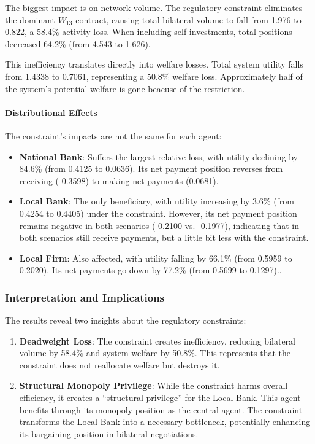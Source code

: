 The biggest impact is on network volume. The regulatory constraint eliminates the dominant $W_{13}$ contract, causing total bilateral volume to fall from 1.976 to 0.822, a 58.4\% activity loss. When including self-investments, total positions decreased 64.2\% (from 4.543 to 1.626).

This inefficiency translates directly into welfare losses. Total system utility falls from 1.4338 to 0.7061, representing a 50.8\% welfare loss. Approximately half of the system's potential welfare is gone beacuse of the restriction.

\paragraph{Distributional Effects}

The constraint's impacts are not the same for each agent:

\begin{itemize}
    \item \textbf{National Bank}: Suffers the largest relative loss, with utility declining by 84.6\% (from 0.4125 to 0.0636). Its net payment position reverses from receiving (-0.3598) to making net payments (0.0681).
    
    \item \textbf{Local Bank}: The only beneficiary, with utility increasing by 3.6\% (from 0.4254 to 0.4405) under the constraint. However, its net payment position remains negative in both scenarios (-0.2100 vs. -0.1977), indicating that in both scenarios still receive payments, but a little bit less with the constraint.

    \item \textbf{Local Firm}: Also affected, with utility falling by 66.1\% (from 0.5959 to 0.2020). Its net payments go down by 77.2\% (from 0.5699 to 0.1297)..
\end{itemize}

\subsubsection{Interpretation and Implications}

The results reveal two insights about the regulatory constraints:

\begin{enumerate}
    \item \textbf{Deadweight Loss}: The constraint creates inefficiency, reducing bilateral volume by 58.4\% and system welfare by 50.8\%. This represents that the constraint does not reallocate welfare but destroys it.
    
    \item \textbf{Structural Monopoly Privilege}: While the constraint harms overall efficiency, it creates a ``structural privilege'' for the Local Bank. This agent benefits through its monopoly position as the central agent. The constraint transforms the Local Bank into a necessary bottleneck, potentially enhancing its bargaining position in bilateral negotiations.
\end{enumerate}

